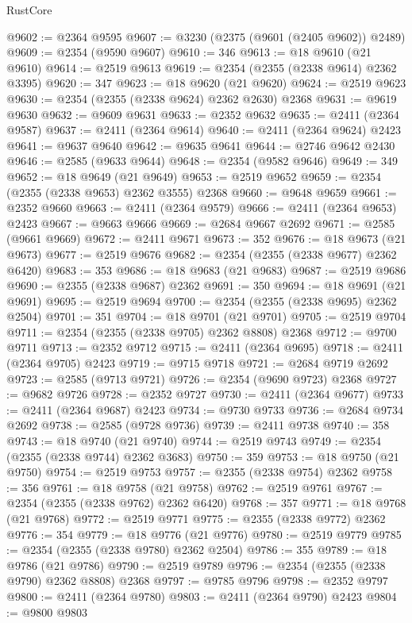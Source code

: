 \begin{lexlean}{RustCore}
\begin{coremodule}
@9602 := @2364 @9595
@9607 := @3230 (@2375 (@9601 (@2405 @9602)) @2489)
@9609 := @2354 (@9590 @9607)
@9610 := 346
@9613 := @18 @9610 (@21 @9610)
@9614 := @2519 @9613
@9619 := @2354 (@2355 (@2338 @9614) @2362 @3395)
@9620 := 347
@9623 := @18 @9620 (@21 @9620)
@9624 := @2519 @9623
@9630 := @2354 (@2355 (@2338 @9624) @2362 @2630) @2368
@9631 := @9619 @9630
@9632 := @9609 @9631
@9633 := @2352 @9632
@9635 := @2411 (@2364 @9587)
@9637 := @2411 (@2364 @9614)
@9640 := @2411 (@2364 @9624) @2423
@9641 := @9637 @9640
@9642 := @9635 @9641
@9644 := @2746 @9642 @2430
@9646 := @2585 (@9633 @9644)
@9648 := @2354 (@9582 @9646)
@9649 := 349
@9652 := @18 @9649 (@21 @9649)
@9653 := @2519 @9652
@9659 := @2354 (@2355 (@2338 @9653) @2362 @3555) @2368
@9660 := @9648 @9659
@9661 := @2352 @9660
@9663 := @2411 (@2364 @9579)
@9666 := @2411 (@2364 @9653) @2423
@9667 := @9663 @9666
@9669 := @2684 @9667 @2692
@9671 := @2585 (@9661 @9669)
@9672 := @2411 @9671
@9673 := 352
@9676 := @18 @9673 (@21 @9673)
@9677 := @2519 @9676
@9682 := @2354 (@2355 (@2338 @9677) @2362 @6420)
@9683 := 353
@9686 := @18 @9683 (@21 @9683)
@9687 := @2519 @9686
@9690 := @2355 (@2338 @9687) @2362
@9691 := 350
@9694 := @18 @9691 (@21 @9691)
@9695 := @2519 @9694
@9700 := @2354 (@2355 (@2338 @9695) @2362 @2504)
@9701 := 351
@9704 := @18 @9701 (@21 @9701)
@9705 := @2519 @9704
@9711 := @2354 (@2355 (@2338 @9705) @2362 @8808) @2368
@9712 := @9700 @9711
@9713 := @2352 @9712
@9715 := @2411 (@2364 @9695)
@9718 := @2411 (@2364 @9705) @2423
@9719 := @9715 @9718
@9721 := @2684 @9719 @2692
@9723 := @2585 (@9713 @9721)
@9726 := @2354 (@9690 @9723) @2368
@9727 := @9682 @9726
@9728 := @2352 @9727
@9730 := @2411 (@2364 @9677)
@9733 := @2411 (@2364 @9687) @2423
@9734 := @9730 @9733
@9736 := @2684 @9734 @2692
@9738 := @2585 (@9728 @9736)
@9739 := @2411 @9738
@9740 := 358
@9743 := @18 @9740 (@21 @9740)
@9744 := @2519 @9743
@9749 := @2354 (@2355 (@2338 @9744) @2362 @3683)
@9750 := 359
@9753 := @18 @9750 (@21 @9750)
@9754 := @2519 @9753
@9757 := @2355 (@2338 @9754) @2362
@9758 := 356
@9761 := @18 @9758 (@21 @9758)
@9762 := @2519 @9761
@9767 := @2354 (@2355 (@2338 @9762) @2362 @6420)
@9768 := 357
@9771 := @18 @9768 (@21 @9768)
@9772 := @2519 @9771
@9775 := @2355 (@2338 @9772) @2362
@9776 := 354
@9779 := @18 @9776 (@21 @9776)
@9780 := @2519 @9779
@9785 := @2354 (@2355 (@2338 @9780) @2362 @2504)
@9786 := 355
@9789 := @18 @9786 (@21 @9786)
@9790 := @2519 @9789
@9796 := @2354 (@2355 (@2338 @9790) @2362 @8808) @2368
@9797 := @9785 @9796
@9798 := @2352 @9797
@9800 := @2411 (@2364 @9780)
@9803 := @2411 (@2364 @9790) @2423
@9804 := @9800 @9803

\end{coremodule}
\end{lexlean}
